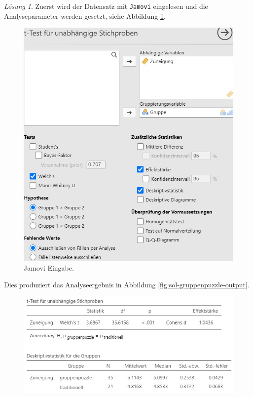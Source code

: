 \documentclass[
]{book}
\theoremstyle{definition}
\theoremstyle{definition}
\theoremstyle{definition}
\theoremstyle{definition}
\theoremstyle{remark}
\newtheorem*{solution}{Lösung}
\begin{document}
\begin{solution}

Zuerst wird der Datensatz mit \texttt{Jamovi} eingelesen und die Analyseparameter werden gesetzt, siehe Abbildung \ref{fig:sol-gruppenpuzzle-input}.

\begin{figure}

{\centering \includegraphics[width=1\linewidth]{figures/06-exr-gruppenpuzzle-jmv-input} 

}

\caption{Jamovi Eingabe.}\label{fig:sol-gruppenpuzzle-input}
\end{figure}

Dies produziert das Analyseergebnis in Abbildung \ref{fig:sol-gruppenpuzzle-output}.

\begin{figure}

{\centering \includegraphics[width=1\linewidth]{figures/06-exr-gruppenpuzzle-jmv-output} 

}
\end{figure}
\end{solution}
\end{document}
